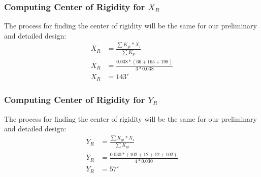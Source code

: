 \documentclass{report} %
\begin{document}
\subsubsection*{Computing Center of Rigidity for $X_R$}
The process for finding the center of rigidity will be the same for our preliminary and detailed design:
\begin{equation*}
    \begin{aligned}
        X_R &= \frac{\sum{K_{yi}*X_i}}{\sum{K_{yi}}} \\
        X_R &= \frac{0.038*(66+165+198)}{3*0.038} \\
        X_R &= 143'
    \end{aligned}
\end{equation*}

\subsubsection*{Computing Center of Rigidity for $Y_R$}
The process for finding the center of rigidity will be the same for our preliminary and detailed design:
\begin{equation*}
    \begin{aligned}
        Y_R &= \frac{\sum{K_{yi}*X_i}}{\sum{K_{yi}}} \\
        Y_R &= \frac{0.030*(102+12+12+102)}{4*0.030} \\
        Y_R &= 57'
    \end{aligned}
\end{equation*}
\end{document}
